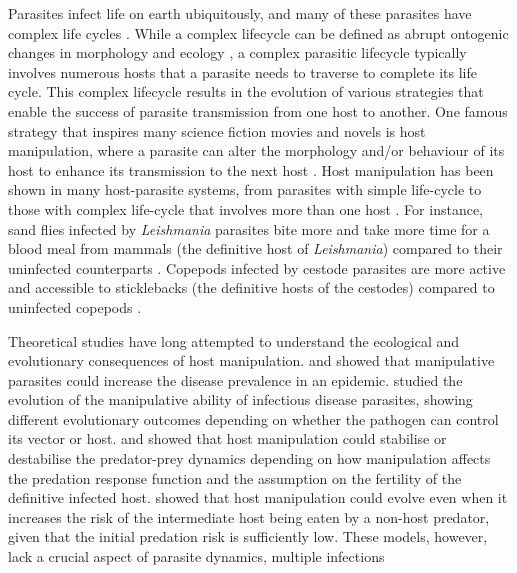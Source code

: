 \documentclass[a4paper]{scrartcl}
\begin{document}
Parasites infect life on earth ubiquitously, and many of these parasites have complex life cycles \citep{zimmer:book:2001}. 
While a complex lifecycle can be defined as abrupt ontogenic changes in morphology and ecology \citep{Benesh:2016dj}, a complex parasitic lifecycle typically involves numerous hosts that a parasite needs to traverse to complete its life cycle. 
This complex lifecycle results in the evolution of various strategies that enable the success of parasite transmission from one host to another. 
One famous strategy that inspires many science fiction movies and novels is host manipulation, where a parasite can alter the morphology and/or behaviour of its  host to enhance its transmission to the next host \citep{Hughes2012}. 
Host manipulation has been shown in many host-parasite systems, from parasites with simple life-cycle to those with complex life-cycle that involves more than one host \citep{Hughes2012,molyneux_jefferies1986}. 
For instance, sand flies infected by \textit{Leishmania} parasites bite more and take more time for a blood meal from mammals (the definitive host of \textit{Leishmania}) compared to their uninfected counterparts \citep{Rogers2007}. 
Copepods infected by cestode parasites are more active and accessible to sticklebacks (the definitive hosts of the cestodes) compared to uninfected copepods \citep{Wedekind1996}.

Theoretical studies have long attempted to understand the ecological and evolutionary consequences of host manipulation. 
\cite{Roosien2013} and \cite{Hosack2008} showed that manipulative parasites could increase the disease prevalence in an epidemic. \cite{Gandon2018} studied the evolution of the manipulative ability of infectious disease parasites, showing different evolutionary outcomes depending on whether the pathogen can control its vector or host.
\cite{Hadeler1989, Fenton2006} and \cite{Rogawa2018} showed that host manipulation could stabilise or destabilise the predator-prey dynamics depending on how manipulation affects the predation response function and the assumption on the fertility of the definitive infected host. 
\cite{Seppl2008} showed that host manipulation could evolve even when it increases the risk of the intermediate host being eaten by a non-host predator, given that the initial predation risk is sufficiently low. 
These models, however, lack a crucial aspect of parasite dynamics, multiple infections \citep{kalbe:JFB:2002} 
\end{document}
